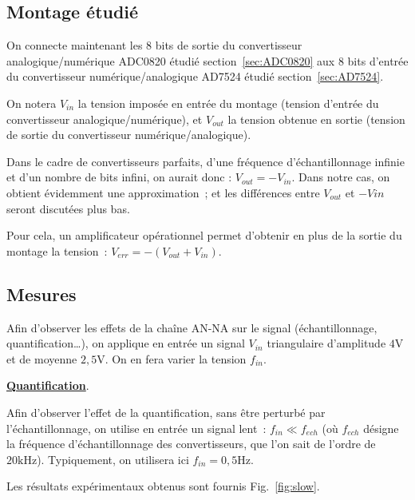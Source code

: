 \documentclass{article}
\begin{document}
\subsection{Montage étudié}

On connecte maintenant les 8 bits de sortie du convertisseur analogique/numérique ADC0820 étudié section~\ref{sec:ADC0820} aux 8 bits d'entrée du convertisseur numérique/analogique AD7524 étudié section~\ref{sec:AD7524}.

On notera $V_{in}$ la tension imposée en entrée du montage (tension d'entrée du convertisseur analogique/numérique), et $V_{out}$ la tension obtenue en sortie (tension de sortie du convertisseur numérique/analogique). 

Dans le cadre de convertisseurs parfaits, d'une fréquence d'échantillonnage infinie et d'un nombre de bits infini, on aurait donc : $V_{out}=-V_{in}$. Dans notre cas, on obtient évidemment une approximation~; et les différences entre $V_{out}$ et $-V{in}$ seront discutées plus bas.

Pour cela, un amplificateur opérationnel permet d'obtenir en plus de la sortie du montage la tension~: ${V_{err}=-(V_{out}+V_{in})}$.

\subsection{Mesures}


Afin d'observer les effets de la chaîne AN-NA sur le signal (échantillonnage, quantification\dots), on applique en entrée un signal $V_{in}$ triangulaire d'amplitude $4\mathrm{V}$ et de moyenne $2,5\mathrm{V}$. On en fera varier la tension $f_{in}$.

\noindent \textbf{\underline{Quantification}}.

Afin d'observer l'effet de la quantification, sans être perturbé par l'échantillonnage, on utilise en entrée un signal lent~: $f_{in}\ll f_{ech}$ (où $f_{ech}$ désigne la fréquence d'échantillonnage des convertisseurs, que l'on sait de l'ordre de $20\mathrm{kHz}$). Typiquement, on utilisera ici $f_{in} = \mathrm{0,5 Hz}$.

Les résultats expérimentaux obtenus sont fournis Fig.~\ref{fig:slow}.
\end{document}
